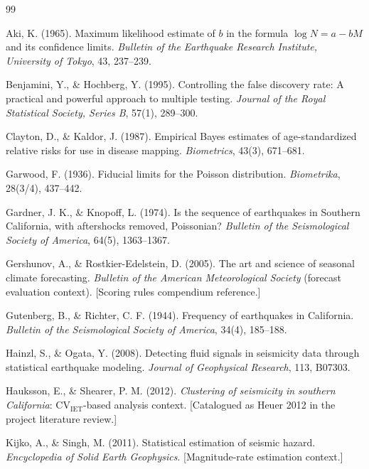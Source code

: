 \documentclass[10pt,a4paper,twocolumn]{article}
\begin{document}
\onecolumn
\begin{thebibliography}{99}
\setlength{\itemsep}{2pt}

 Aki, K. (1965). Maximum likelihood estimate of $b$ in the formula $\log N = a - bM$ and its confidence limits. \emph{Bulletin of the Earthquake Research Institute, University of Tokyo}, 43, 237--239.

 Benjamini, Y., \& Hochberg, Y. (1995). Controlling the false discovery rate: A practical and powerful approach to multiple testing. \emph{Journal of the Royal Statistical Society, Series B}, 57(1), 289--300.

 Clayton, D., \& Kaldor, J. (1987). Empirical Bayes estimates of age-standardized relative risks for use in disease mapping. \emph{Biometrics}, 43(3), 671--681.

 Garwood, F. (1936). Fiducial limits for the Poisson distribution. \emph{Biometrika}, 28(3/4), 437--442.

 Gardner, J. K., \& Knopoff, L. (1974). Is the sequence of earthquakes in Southern California, with aftershocks removed, Poissonian? \emph{Bulletin of the Seismological Society of America}, 64(5), 1363--1367.

 Gershunov, A., \& Rostkier-Edelstein, D. (2005). The art and science of seasonal climate forecasting. \emph{Bulletin of the American Meteorological Society} (forecast evaluation context). [Scoring rules compendium reference.]

 Gutenberg, B., \& Richter, C. F. (1944). Frequency of earthquakes in California. \emph{Bulletin of the Seismological Society of America}, 34(4), 185--188.

 Hainzl, S., \& Ogata, Y. (2008). Detecting fluid signals in seismicity data through statistical earthquake modeling. \emph{Journal of Geophysical Research}, 113, B07303.

 Hauksson, E., \& Shearer, P. M. (2012). \emph{Clustering of seismicity in southern California}: CV$_{\text{IET}}$-based analysis context. [Catalogued as Heuer 2012 in the project literature review.]

 Kijko, A., \& Singh, M. (2011). Statistical estimation of seismic hazard. \emph{Encyclopedia of Solid Earth Geophysics}. [Magnitude-rate estimation context.]


\end{thebibliography}
\end{document}
